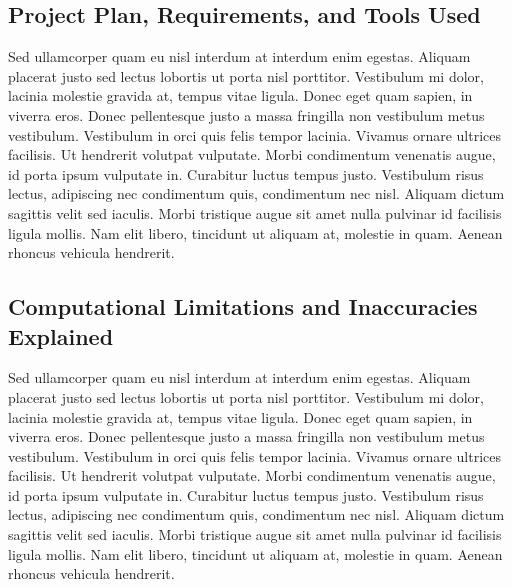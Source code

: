 \subsection{Project Plan, Requirements, and Tools Used}

Sed ullamcorper quam eu nisl interdum at interdum enim egestas. Aliquam placerat justo sed lectus lobortis ut porta nisl porttitor. Vestibulum mi dolor, lacinia molestie gravida at, tempus vitae ligula. Donec eget quam sapien, in viverra eros. Donec pellentesque justo a massa fringilla non vestibulum metus vestibulum. Vestibulum in orci quis felis tempor lacinia. Vivamus ornare ultrices facilisis. Ut hendrerit volutpat vulputate. Morbi condimentum venenatis augue, id porta ipsum vulputate in. Curabitur luctus tempus justo. Vestibulum risus lectus, adipiscing nec condimentum quis, condimentum nec nisl. Aliquam dictum sagittis velit sed iaculis. Morbi tristique augue sit amet nulla pulvinar id facilisis ligula mollis. Nam elit libero, tincidunt ut aliquam at, molestie in quam. Aenean rhoncus vehicula hendrerit.


\subsection{Computational Limitations and Inaccuracies Explained}

Sed ullamcorper quam eu nisl interdum at interdum enim egestas. Aliquam placerat justo sed lectus lobortis ut porta nisl porttitor. Vestibulum mi dolor, lacinia molestie gravida at, tempus vitae ligula. Donec eget quam sapien, in viverra eros. Donec pellentesque justo a massa fringilla non vestibulum metus vestibulum. Vestibulum in orci quis felis tempor lacinia. Vivamus ornare ultrices facilisis. Ut hendrerit volutpat vulputate. Morbi condimentum venenatis augue, id porta ipsum vulputate in. Curabitur luctus tempus justo. Vestibulum risus lectus, adipiscing nec condimentum quis, condimentum nec nisl. Aliquam dictum sagittis velit sed iaculis. Morbi tristique augue sit amet nulla pulvinar id facilisis ligula mollis. Nam elit libero, tincidunt ut aliquam at, molestie in quam. Aenean rhoncus vehicula hendrerit.